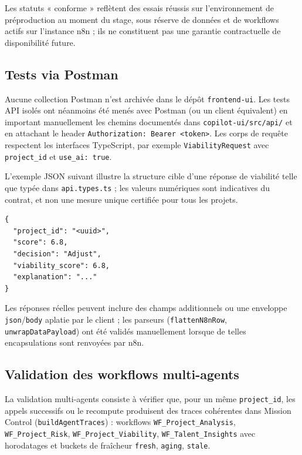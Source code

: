 Les statuts « conforme » reflètent des essais réussis sur l'environnement de préproduction au moment du stage, sous réserve de données et de workflows actifs sur l'instance n8n ; ils ne constituent pas une garantie contractuelle de disponibilité future.

\subsection{Tests via Postman}

Aucune collection Postman n'est archivée dans le dépôt \texttt{frontend-ui}. Les tests API isolés ont néanmoins été menés avec Postman (ou un client équivalent) en important manuellement les chemins documentés dans \texttt{copilot-ui/src/api/} et en attachant le header \texttt{Authorization: Bearer <token>}. Les corps de requête respectent les interfaces TypeScript, par exemple \texttt{ViabilityRequest} avec \texttt{project\_id} et \texttt{use\_ai: true}.

L'exemple JSON suivant illustre la structure cible d'une réponse de viabilité telle que typée dans \texttt{api.types.ts} ; les valeurs numériques sont indicatives du contrat, et non une mesure unique certifiée pour tous les projets.

\begin{lstlisting}[caption={Structure attendue de \texttt{ViabilityResponse} (extrait de contrat)}]
{
  "project_id": "<uuid>",
  "score": 6.8,
  "decision": "Adjust",
  "viability_score": 6.8,
  "explanation": "..."
}
\end{lstlisting}

Les réponses réelles peuvent inclure des champs additionnels ou une enveloppe \texttt{json}/\texttt{body} aplatie par le client ; les parseurs (\texttt{flattenN8nRow}, \texttt{unwrapDataPayload}) ont été validés manuellement lorsque de telles encapsulations sont renvoyées par n8n.

\subsection{Validation des workflows multi-agents}

La validation multi-agents consiste à vérifier que, pour un même \texttt{project\_id}, les appels successifs ou le recompute produisent des traces cohérentes dans Mission Control (\texttt{buildAgentTraces}) : workflows \texttt{WF\_Project\_Analysis}, \texttt{WF\_Project\_Risk}, \texttt{WF\_Project\_Viability}, \texttt{WF\_Talent\_Insights} avec horodatages et buckets de fraîcheur \texttt{fresh}, \texttt{aging}, \texttt{stale}.

